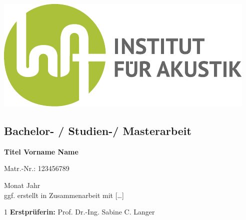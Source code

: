 \documentclass[a4paper,12pt,arial, rgb]{tubsartcl}
\begin{document}
\begin{gausspage}
\begin{segment}[c,bgcolor=tubsLightGray]{2}	
\end{segment}
\begin{segment}[c,bgcolor=tubsWhite]{2}	
	\begin{center}
	\includegraphics[scale=0.5]{../pics/placeholder} 
	\end{center}
\end{segment}
\begin{segment}[c,bgcolor=InAGreen,fgcolor=tubsWhite]{3}					\large \noindent
\section*{\textcolor{tubsWhite}{Bachelor- / Studien-/  Masterarbeit}} 	
\textbf{
Titel Vorname Name 		
}

Matr.-Nr.: 123456789

{\small
Monat Jahr	\\
ggf. erstellt in Zusammenarbeit mit [\ldots]
}
\end{segment}
\begin{segment}[innerpadding=vnone,bgcolor=tubsGreen,%
	fgcolor=tubsWhite]{1} \vskip-3pt \large%
\textbf{Erstprüferin:} Prof. Dr.-Ing. Sabine C. Langer
\end{segment}
\end{gausspage}
\end{document}
